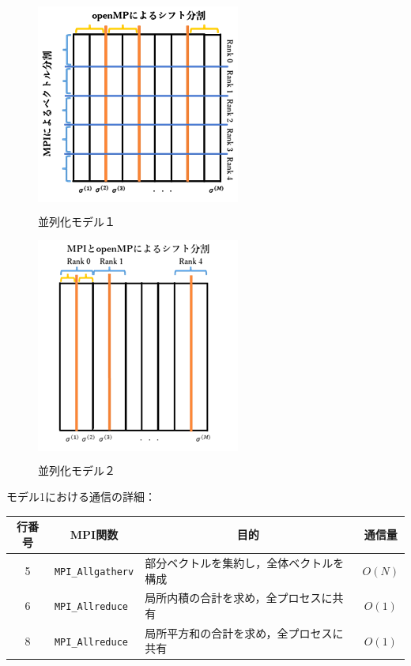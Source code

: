 \vspace{1.06pt}
\begin{figure}[H]
	\begin{center}
		\begin{minipage}[t]{0.49\columnwidth}
			\centering
			\colorbox{white}{ \includegraphics[scale=2.1]{./fig/parallel-model1.png} }
			\caption{並列化モデル１}
			\label{fig-parallel-model1}
		\end{minipage}
		\begin{minipage}[t]{0.49\columnwidth}
			\centering
			\colorbox{white}{ \includegraphics[scale=2.1]{./fig/parallel-model2.png} }
			\caption{並列化モデル２}
			\label{fig-parallel-model2}
		\end{minipage}
	\end{center}
\end{figure}

\vspace{5pt}
モデル1における通信の詳細：
\begin{table}[H]
	\centering
	\small
	\begin{tabular}{|c|l|l|c|}
	\hline
	行番号	& \multicolumn{1}{c|}{MPI関数}	& \multicolumn{1}{c|}{目的}				& 通信量	\\ \hline
	5		& \texttt{MPI\_Allgatherv}	& 部分ベクトルを集約し，全体ベクトルを構成		& $O(N)$	\\ \hline
	6		& \texttt{MPI\_Allreduce}	& 局所内積の合計を求め，全プロセスに共有		& $O(1)$	\\ \hline
	8		& \texttt{MPI\_Allreduce}	& 局所平方和の合計を求め，全プロセスに共有	& $O(1)$	\\ \hline
	\end{tabular}
\end{table}



